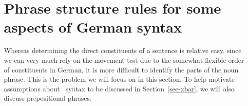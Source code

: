 


\section{Phrase structure rules for some aspects of German syntax}

Whereas determining the direct constituents of a sentence is relative easy, since we can very much rely on the movement test due to the
somewhat flexible order of constituents in German, it is more difficult to identify the parts of the noun phrase. This is the problem
we will focus on in this section. To help motivate assumptions about \xbar~syntax to be discussed in Section~\ref{sec-xbar},
we will also discuss prepositional phrases.


